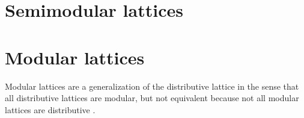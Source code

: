 \section{Semimodular lattices}
\begin{definition}
\label{def:latsm}
\end{definition}


\section{Modular lattices}
Modular lattices are a generalization of the distributive lattice in the sense that
all distributive lattices are modular,
but not equivalent because not all modular lattices are distributive
.

\begin{definition}
\label{def:lat_mod}
\label{def:latm}
\end{definition}


